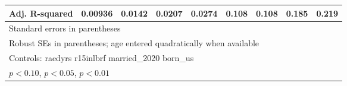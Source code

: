 \begin{table}[htbp]
\begin{tabular}{l*{8}{c}}
Adj. R-squared  &  0.00936         &   0.0142         &   0.0207         &   0.0274         &    0.108         &    0.108         &    0.185         &    0.219         \\
\bottomrule
\multicolumn{9}{l}{\footnotesize Standard errors in parentheses}\\
\multicolumn{9}{l}{\footnotesize Robust SEs in parentheses; age entered quadratically when available}\\
\multicolumn{9}{l}{\footnotesize Controls:  raedyrs r15inlbrf married\_2020 born\_us}\\
\multicolumn{9}{l}{\footnotesize \sym{*} \(p<0.10\), \sym{**} \(p<0.05\), \sym{***} \(p<0.01\)}\\
\end{tabular}
\end{table}
